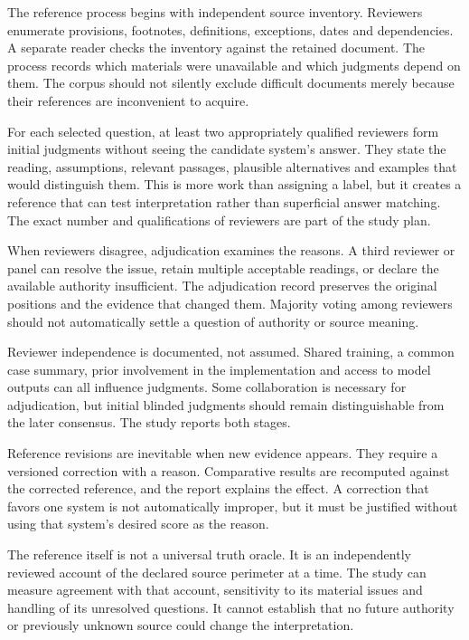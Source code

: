 \documentclass[12pt,a4paper,oneside,openany]{book}
\begin{document}
The reference process begins with independent source inventory. Reviewers enumerate
provisions, footnotes, definitions, exceptions, dates and dependencies. A separate
reader checks the inventory against the retained document. The process records
which materials were unavailable and which judgments depend on them. The corpus
should not silently exclude difficult documents merely because their references
are inconvenient to acquire.

For each selected question, at least two appropriately qualified reviewers form
initial judgments without seeing the candidate system's answer. They state the
reading, assumptions, relevant passages, plausible alternatives and examples that
would distinguish them. This is more work than assigning a label, but it creates
a reference that can test interpretation rather than superficial answer matching.
The exact number and qualifications of reviewers are part of the study plan.

When reviewers disagree, adjudication examines the reasons. A third reviewer or
panel can resolve the issue, retain multiple acceptable readings, or declare the
available authority insufficient. The adjudication record preserves the original
positions and the evidence that changed them. Majority voting among reviewers
should not automatically settle a question of authority or source meaning.

Reviewer independence is documented, not assumed. Shared training, a common case
summary, prior involvement in the implementation and access to model outputs can
all influence judgments. Some collaboration is necessary for adjudication, but
initial blinded judgments should remain distinguishable from the later consensus.
The study reports both stages.

Reference revisions are inevitable when new evidence appears. They require a
versioned correction with a reason. Comparative results are recomputed against
the corrected reference, and the report explains the effect. A correction that
favors one system is not automatically improper, but it must be justified without
using that system's desired score as the reason.

The reference itself is not a universal truth oracle. It is an independently
reviewed account of the declared source perimeter at a time. The study can measure
agreement with that account, sensitivity to its material issues and handling of
its unresolved questions. It cannot establish that no future authority or
previously unknown source could change the interpretation.
\end{document}
